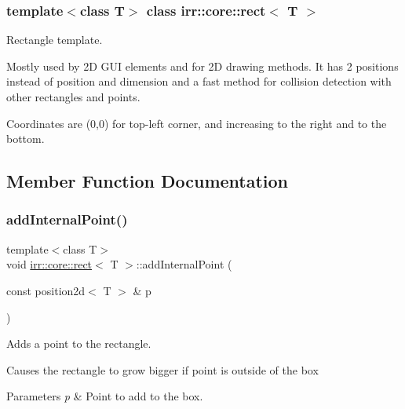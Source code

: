 \subsubsection*{template$<$class T$>$\newline
class irr\+::core\+::rect$<$ T $>$}

Rectangle template. 

Mostly used by 2D G\+UI elements and for 2D drawing methods. It has 2 positions instead of position and dimension and a fast method for collision detection with other rectangles and points.

Coordinates are (0,0) for top-\/left corner, and increasing to the right and to the bottom. 

\subsection{Member Function Documentation}
\mbox{\label{classirr_1_1core_1_1rect_a0b7496319a32ceda640c730f5822f1ef}} 
\subsubsection{\texorpdfstring{add\+Internal\+Point()}{addInternalPoint()}\hspace{0.1cm}{\footnotesize\ttfamily [1/4]}}
{\footnotesize\ttfamily template$<$class T$>$ \\
void \hyperlink{classirr_1_1core_1_1rect}{irr\+::core\+::rect}$<$ T $>$\+::add\+Internal\+Point (\begin{DoxyParamCaption}\item[{const position2d$<$ T $>$ \&}]{p }\end{DoxyParamCaption})\hspace{0.3cm}{\ttfamily [inline]}}



Adds a point to the rectangle. 

Causes the rectangle to grow bigger if point is outside of the box 
\begin{DoxyParams}{Parameters}
{\em p} & Point to add to the box. \\
\hline
\end{DoxyParams}
\mbox{\label{classirr_1_1core_1_1rect_a0b7496319a32ceda640c730f5822f1ef}} 
